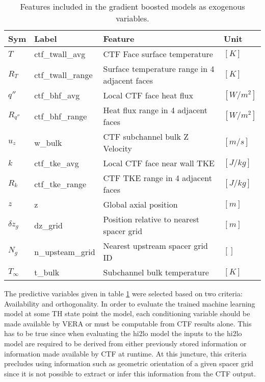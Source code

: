 \begin{table}[h]
    \begin{center}
    \caption[Included exogenous training features.]{Features included in the gradient boosted models as exogenous variables.}
\begin{tabular}[h]{|l | l | l | l |}
    \hline
    Sym & Label & Feature & Unit \\
    \hline
    \hline
    $T$ & ctf\_twall\_avg & CTF Face surface temperature & $[K]$ \\
    $R_T$ & ctf\_twall\_range & Surface temperature range in 4 adjacent faces & $[K]$ \\
    $q''$ & ctf\_bhf\_avg & Local CTF face heat flux & $[W/m^2]$ \\
    $R_{q''}$ & ctf\_bhf\_range & Heat flux range in 4 adjacent faces & $[W/m^2]$ \\
    $u_z$ & w\_bulk & CTF subchannel bulk Z Velocity &  $[m/s]$ \\
    $k$ & ctf\_tke\_avg & Local CTF face near wall TKE &  $[J/kg]$ \\
    $R_k$ & ctf\_tke\_range & CTF TKE range in 4 adjacent faces & $[J/kg]$ \\
    $z$ & z & Global axial position & $[m]$ \\
    $\delta z_g$ & dz\_grid & Position relative to nearest spacer grid & $[m]$ \\
    $N_g$ & n\_upsteam\_grid  & Nearest upstream spacer grid ID & $[]$ \\
    $T_\infty$ & t\_bulk & Subchannel bulk temperature  &  $[K]$ \\
    \hline
\end{tabular}
\label{tab:features}
\end{center}
\end{table}

The predictive variables given in table \ref{tab:features} were selected based on two criteria:  Availability and orthogonality.  In order to evaluate the trained machine learning model at some TH state point the model, each conditioning variable should be made available by VERA or must be computable from CTF results alone.  
This has to be true since when evaluating the hi2lo model the inputs to the hi2lo model are required to be derived from either previously stored information or information made available by CTF at runtime.  At this juncture, this criteria precludes using information such as geometric orientation of a given spacer grid since it is not possible to extract or infer this information from the CTF output.


